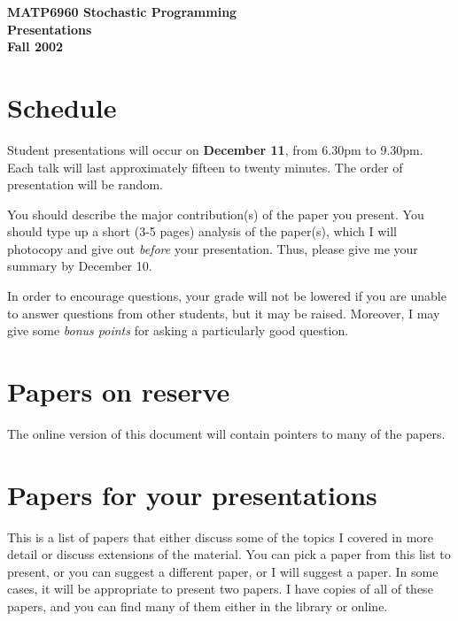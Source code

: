 \documentclass[12pt]{article}
\begin{document}

\pagestyle{myheadings}

\begin{center}
  \begin{large}
    {\bf MATP6960 Stochastic Programming} \\
    {\bf Presentations} \\   {\bf Fall 2002} 
  \end{large}
\end{center}

\section{Schedule}

Student presentations will occur on {\bf December 11}, from 6.30pm to 9.30pm.
Each talk will last approximately fifteen to twenty minutes.
The order of presentation will be random.

You should describe the major contribution(s) of the paper you present.
You should type up a short (3-5 pages) analysis of the paper(s),
which I will photocopy and give out
{\em before} your presentation. Thus, please give me your summary by December 10.

In order to encourage questions, your grade will not be lowered if you are unable to answer questions from other students, but it may be raised. Moreover, I may give some
{\em bonus points} for asking a particularly good question.


\section{Papers on reserve}


The online version of this document will contain pointers to many of the papers.

\section{Papers for your presentations}

This is a list of papers that either discuss some of the topics I covered
in more detail or discuss extensions of the material.
You can pick a paper from this list to present, or you can suggest
a different paper, or I will suggest a paper.
In some cases, it will be appropriate to present two papers.
I have copies of all of these papers, and you can find many of them
either in the library or online.
\end{document}
